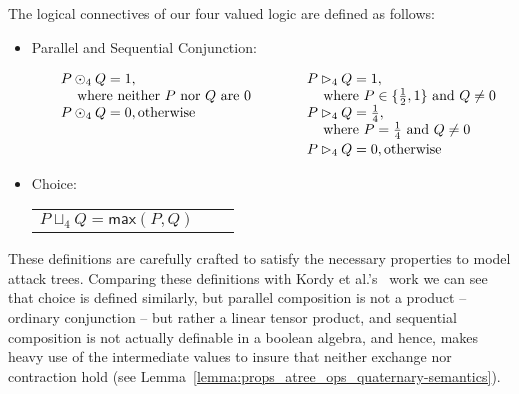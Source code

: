 \begin{definition}
  \label{def:logical-connectives}
  The logical connectives of our four valued logic are defined as
  follows:\vspace{-5px}
  \begin{itemize}
  \item[] Parallel and Sequential Conjunction:\vspace{-19px}
    \begin{center}
      \begin{math}
        \setlength{\arraycolsep}{10px}
        \begin{array}{lll}
          \begin{array}{lll}
            P \odot_4 Q = 1,\\
            \,\,\,\,\,\,\,\text{where neither $P$ nor $Q$ are $0$}\\
          P \odot_4 Q = 0, \text{otherwise}\\
          \\[14px]
        \end{array}
        &
        \begin{array}{lll}          
          P \rhd_4 Q = 1,\\
          \,\,\,\,\,\,\,\text{where } P \in \{\half, 1\} \text{ and } Q \neq 0\\
          P \rhd_4 Q = \forth, \\
          \,\,\,\,\,\,\,\text{where $P = \forth$ and $Q \neq 0$}\\[2px]         
          P \rhd_4 Q = 0, \text{otherwise}
        \end{array}
        \end{array}
      \end{math}
    \end{center}
    \vspace{-5px}
  \item[] Choice: \\    
    \begin{tabular}{lll}
      \hspace{19px}$P \sqcup_4 Q = \mathsf{max}(P,Q)$    
    \end{tabular}
  \end{itemize}
\end{definition}
These definitions are carefully crafted to satisfy the necessary
properties to model attack trees.  Comparing these definitions with
Kordy et al.'s~\cite{Kordy:2012} work we can see that choice is
defined similarly, but parallel composition is not a product --
ordinary conjunction -- but rather a linear tensor product, and
sequential composition is not actually definable in a boolean algebra,
and hence, makes heavy use of the intermediate values to insure that
neither exchange nor contraction hold (see
Lemma~\ref{lemma:props_atree_ops_quaternary-semantics}).

